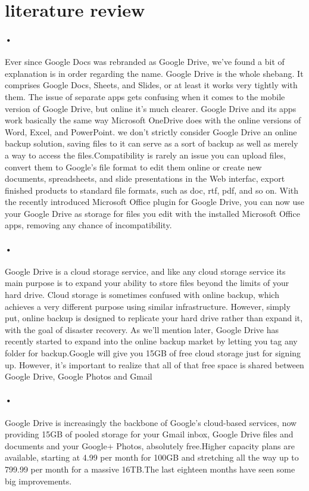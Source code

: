\documentclass[11pt]{article}
\begin{document}
\section{literature review}
\paragraph{•}
\cite{A4}Ever since Google Docs was rebranded as Google Drive, we've found a bit of explanation is in order regarding the name. Google Drive is the whole shebang. It comprises Google Docs, Sheets, and Slides, or at least it works very tightly with them. The issue of separate apps gets confusing when it comes to the mobile version of Google Drive, but online it's much clearer. Google Drive and its apps work basically the same way Microsoft OneDrive does with the online versions of Word, Excel, and PowerPoint. we don't strictly consider Google Drive an online backup solution, saving files to it can serve as a sort of backup as well as merely a way to access the files.Compatibility is rarely an issue you can upload files, convert them to Google's file format to edit them online or create new documents, spreadsheets, and slide presentations in the Web interfac, export finished products to standard file formats, such as doc, rtf, pdf, and so on. With the recently introduced Microsoft Office plugin for Google Drive, you can now use your Google Drive as storage for files you edit with the installed Microsoft Office apps, removing any chance of incompatibility.

\paragraph{•}
\cite{A5}Google Drive is a cloud storage service, and like any cloud storage service its main purpose is to expand your ability to store files beyond the limits of your hard drive. Cloud storage is sometimes confused with online backup, which achieves a very different purpose using similar infrastructure. However, simply put, online backup is designed to replicate your hard drive rather than expand it, with the goal of disaster recovery. As we’ll mention later, Google Drive has recently started to expand into the online backup market by letting you tag any folder for backup.Google will give you 15GB of free cloud storage just for signing up. However, it’s important to realize that all of that free space is shared between Google Drive, Google Photos and Gmail
\paragraph{•}
\cite{A6}Google Drive is increasingly the backbone of Google’s cloud-based services, now providing 15GB of pooled storage for your Gmail inbox, Google Drive files and documents and your Google+ Photos, absolutely free.Higher capacity plans are available, starting at 4.99 per month for 100GB and stretching all the way up to 799.99 per month for a massive 16TB.The last eighteen months have seen some big improvements.
\end{document}
